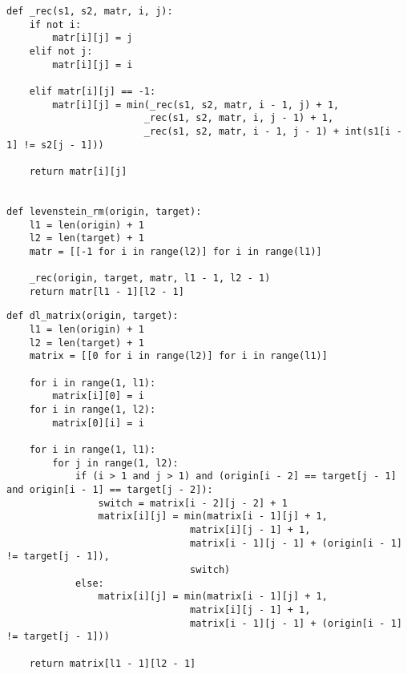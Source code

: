 \begin{lstlisting}[caption= Матрично-рекурсивный алгоритм поиска расстояния Левенштейна]
def _rec(s1, s2, matr, i, j):
	if not i:
		matr[i][j] = j
	elif not j:
		matr[i][j] = i
	
	elif matr[i][j] == -1:
		matr[i][j] = min(_rec(s1, s2, matr, i - 1, j) + 1, 
						_rec(s1, s2, matr, i, j - 1) + 1,
						_rec(s1, s2, matr, i - 1, j - 1) + int(s1[i - 1] != s2[j - 1]))
	
	return matr[i][j]


def levenstein_rm(origin, target):
	l1 = len(origin) + 1
	l2 = len(target) + 1
	matr = [[-1 for i in range(l2)] for i in range(l1)]
	
	_rec(origin, target, matr, l1 - 1, l2 - 1)
	return matr[l1 - 1][l2 - 1]
\end{lstlisting}

\begin{lstlisting}[caption= Матричный алгоритм поиска расстояния Дамерау-Левенштейна]
def dl_matrix(origin, target):
	l1 = len(origin) + 1
	l2 = len(target) + 1
	matrix = [[0 for i in range(l2)] for i in range(l1)]
	
	for i in range(1, l1):
		matrix[i][0] = i
	for i in range(1, l2):
		matrix[0][i] = i
	
	for i in range(1, l1):
		for j in range(1, l2):
			if (i > 1 and j > 1) and (origin[i - 2] == target[j - 1] and origin[i - 1] == target[j - 2]):
				switch = matrix[i - 2][j - 2] + 1
				matrix[i][j] = min(matrix[i - 1][j] + 1,
								matrix[i][j - 1] + 1,
								matrix[i - 1][j - 1] + (origin[i - 1] != target[j - 1]),
								switch)
			else:                    
				matrix[i][j] = min(matrix[i - 1][j] + 1,
								matrix[i][j - 1] + 1,
								matrix[i - 1][j - 1] + (origin[i - 1] != target[j - 1]))
	
	return matrix[l1 - 1][l2 - 1]
\end{lstlisting}

